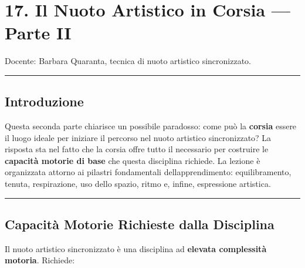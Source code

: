 \documentclass[a4paper,11pt]{article}
\begin{document}
\section{17. Il Nuoto Artistico in Corsia --- Parte
  II}\label{il-nuoto-artistico-in-corsia-parte-ii}

Docente: Barbara Quaranta, tecnica di nuoto artistico sincronizzato.

\begin{center}\rule{0.5\linewidth}{0.5pt}\end{center}

\subsection{Introduzione}\label{introduzione-16}

Questa seconda parte chiarisce un possibile paradosso: come può la
\textbf{corsia} essere il luogo ideale per iniziare il percorso nel
nuoto artistico sincronizzato? La risposta sta nel fatto che la corsia
offre tutto il necessario per costruire le \textbf{capacità motorie di
      base} che questa disciplina richiede. La lezione è organizzata attorno
ai pilastri fondamentali dell\textquotesingle apprendimento:
equilibramento, tenuta, respirazione, uso dello spazio, ritmo e, infine,
espressione artistica.

\begin{center}\rule{0.5\linewidth}{0.5pt}\end{center}

\subsection{Capacità Motorie Richieste dalla
      Disciplina}\label{capacituxe0-motorie-richieste-dalla-disciplina}

Il nuoto artistico sincronizzato è una disciplina ad \textbf{elevata
      complessità motoria}. Richiede:
\end{document}
